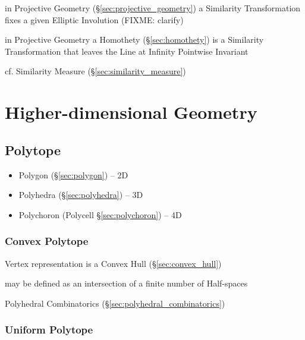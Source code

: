 in Projective Geometry (\S\ref{sec:projective_geometry}) a Similarity
Transformation fixes a given Elliptic Involution (FIXME: clarify)

in Projective Geometry a Homothety (\S\ref{sec:homothety}) is a Similarity
Transformation that leaves the Line at Infinity Pointwise Invariant

\fist cf. Similarity Measure (\S\ref{sec:similarity_measure})



\section{Higher-dimensional Geometry}\label{sec:higher_geometry}

\subsection{Polytope}\label{sec:polytope}

\begin{itemize}
  \item Polygon (\S\ref{sec:polygon}) -- 2D
  \item Polyhedra (\S\ref{sec:polyhedra}) -- 3D
  \item Polychoron (Polycell \S\ref{sec:polychoron}) -- 4D
\end{itemize}



\subsubsection{Convex Polytope}\label{sec:convex_polytope}

Vertex representation is a Convex Hull (\S\ref{sec:convex_hull})

may be defined as an intersection of a finite number of Half-spaces

\fist Polyhedral Combinatorics (\S\ref{sec:polyhedral_combinatorics})



\subsubsection{Uniform Polytope}\label{sec:uniform_polytope}

